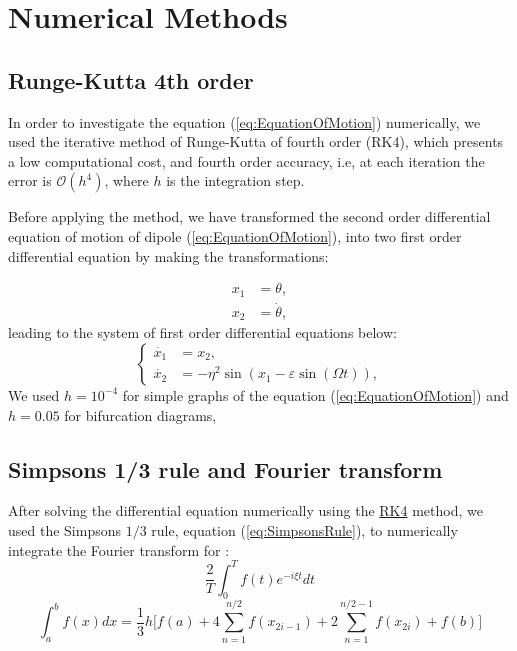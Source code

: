 \section{Numerical Methods}

\subsection{Runge-Kutta 4th order}
\label{sec:RK4}
In order to investigate the equation (\ref{eq:EquationOfMotion}) numerically, we used the iterative method of Runge-Kutta of fourth order (RK4), which presents a low computational cost, and fourth order accuracy, i.e, at each iteration the error is $\mathcal{O}(h^4)$, where $h$ is the integration step.

Before applying the method, we have transformed the second order differential equation of motion of dipole (\ref{eq:EquationOfMotion}), into two first order differential equation by making the transformations:

\begin{equation}
    \begin{aligned}
        x_1 &= \theta,\\
        x_2 &= \dot{\theta}, 
    \end{aligned}
\end{equation}
leading to the system of first order differential equations below:
\begin{equation}
    \begin{cases}
        \dot{x_1} &= x_2,\\
        \dot{x_2} &= -\eta^2 \sin(x_1 - \varepsilon \sin(\Omega t)),
    \end{cases}
\end{equation}
We used $h=10^{-4}$ for simple graphs of the equation (\ref{eq:EquationOfMotion}) and $h = 0.05$ for bifurcation diagrams,
\subsection{Simpson\textquotesingle s 1/3 rule and Fourier transform}
After solving the differential equation numerically using the \hyperref[sec:RK4]{RK4} method, we used the Simpson\textquotesingle s $1/3$ rule, equation (\ref{eq:SimpsonsRule}), to numerically integrate the Fourier transform for : 
\begin{equation}
    \dfrac{2}{T}\int_{0}^{T} f(t) e^{- i \xi t}dt
\end{equation}
\begin{equation}
    \int_{a}^{b} f(x) dx = \dfrac{1}{3} h\bigg[ f(a) + 4\sum^{n/2}_{n=1}f(x_{2i-1}) +2 \sum^{n/2 - 1}_{n=1}f(x_{2i})+f(b) \bigg]
    \label{eq:SimpsonsRule}
\end{equation}
